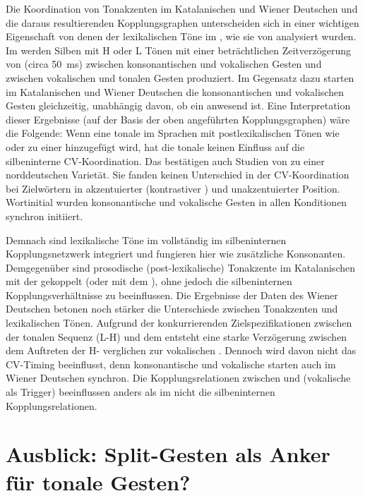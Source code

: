 Die Koordination von Tonakzenten im Katalanischen und Wiener Deutschen und die daraus resultierenden Kopplungsgraphen unterscheiden sich in einer wichtigen Eigenschaft von denen der lexikalischen Töne im , wie sie von \citet{Gao2009} analysiert wurden. Im  werden Silben mit H oder L Tönen mit einer beträchtlichen Zeitverzögerung von (circa 50~ms) zwischen konsonantischen und vokalischen Gesten und zwischen vokalischen und tonalen Gesten produziert. Im Gegensatz dazu starten im Katalanischen und Wiener Deutschen die konsonantischen und vokalischen Gesten gleichzeitig, unabhängig davon, ob ein  anwesend ist. Eine Interpretation dieser Ergebnisse (auf der Basis der oben angeführten Kopplungsgraphen) wäre die Folgende: Wenn eine tonale  im Sprachen mit postlexikalischen Tönen wie  oder  zu einer  hinzugefügt wird, hat die tonale  keinen Einfluss auf die silbeninterne CV-Koordination. Das bestätigen auch Studien von \citet{Niemann2011} zu einer norddeutschen Varietät. Sie fanden keinen Unterschied in der CV-Koordination bei Zielwörtern in akzentuierter (kontrastiver ) und unakzentuierter Position. Wortinitial wurden konsonantische und vokalische Gesten in allen Konditionen synchron initiiert.

\newpage 
Demnach sind lexikalische Töne im  vollständig im silbeninternen Kopplungsnetzwerk integriert und fungieren hier wie zusätzliche Konsonanten. Demgegenüber sind prosodische (post-lexikalische) Tonakzente im Katalanischen mit der  gekoppelt (oder mit dem ), ohne jedoch die silbeninternen Kopplungsverhältnisse zu beeinflussen. Die Ergebnisse der Daten des Wiener Deutschen betonen noch stärker die Unterschiede zwischen Tonakzenten und lexikalischen Tönen. Aufgrund der konkurrierenden Zielspezifikationen zwischen der tonalen Sequenz (L-H) und dem  entsteht eine starke Verzögerung zwischen dem Auftreten der H- verglichen zur vokalischen . Dennoch wird davon nicht das CV-Timing beeinflusst, denn konsonantische und vokalische  starten auch im Wiener Deutschen synchron. Die Kopplungsrelationen zwischen  und  (vokalische  als Trigger) beeinflussen anders als im  nicht die silbeninternen Kopplungsrelationen.

\section{Ausblick: Split-Gesten als Anker für tonale Gesten?}
\label{sec:0703}

